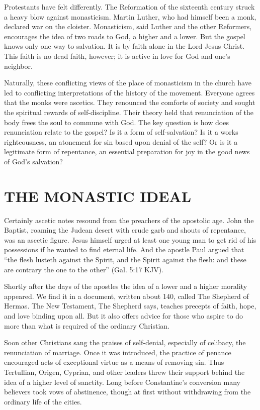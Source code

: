 Protestants have felt differently. The Reformation of the sixteenth century struck a heavy blow
against monasticism. Martin Luther, who had himself been a monk, declared war on the cloister.
Monasticism, said Luther and the other Reformers, encourages the idea of two roads to God, a higher
and a lower. But the gospel knows only one way to salvation. It is by faith alone in the Lord Jesus
Christ. This faith is no dead faith, however; it is active in love for God and one’s neighbor.

Naturally, these conflicting views of the place of monasticism in the church have led to conflicting
interpretations of the history of the movement. Everyone agrees that the monks were ascetics. They
renounced the comforts of society and sought the spiritual rewards of self-discipline. Their theory
held that renunciation of the body frees the soul to commune with God. The key question is how does
renunciation relate to the gospel? Is it a form of self-salvation? Is it a works righteousness, an
atonement for sin based upon denial of the self? Or is it a legitimate form of repentance, an
essential preparation for joy in the good news of God’s salvation?

\section{THE MONASTIC IDEAL}

Certainly ascetic notes resound from the preachers of the apostolic age. John the Baptist, roaming
the Judean desert with crude garb and shouts of repentance, was an ascetic figure. Jesus himself
urged at least one young man to get rid of his possessions if he wanted to find eternal life. And
the apostle Paul argued that “the flesh lusteth against the Spirit, and the Spirit against the
flesh: and these are contrary the one to the other” (Gal. 5:17 KJV).

Shortly after the days of the apostles the idea of a lower and a higher morality appeared. We find
it in a document, written about 140, called The Shepherd of Hermas. The New Testament, The Shepherd
says, teaches precepts of faith, hope, and love binding upon all. But it also offers advice for
those who aspire to do more than what is required of the ordinary Christian.

Soon other Christians sang the praises of self-denial, especially of celibacy, the renunciation of
marriage. Once it was introduced, the practice of penance encouraged acts of exceptional virtue as a
means of removing sin. Thus Tertullian, Origen, Cyprian, and other leaders threw their support
behind the idea of a higher level of sanctity. Long before Constantine’s conversion many believers
took vows of abstinence, though at first without withdrawing from the ordinary life of the cities.

